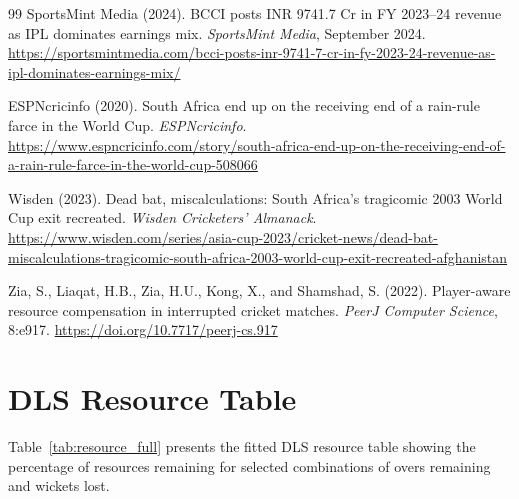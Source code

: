 \documentclass[12pt,a4paper,oneside]{report}
\begin{document}
\begin{thebibliography}{99}
SportsMint Media (2024).
\newblock BCCI posts INR 9741.7 Cr in FY 2023--24 revenue as IPL dominates earnings mix.
\newblock \emph{SportsMint Media}, September 2024.
\newblock \url{https://sportsmintmedia.com/bcci-posts-inr-9741-7-cr-in-fy-2023-24-revenue-as-ipl-dominates-earnings-mix/}

ESPNcricinfo (2020).
\newblock South Africa end up on the receiving end of a rain-rule farce in the World Cup.
\newblock \emph{ESPNcricinfo}.
\newblock \url{https://www.espncricinfo.com/story/south-africa-end-up-on-the-receiving-end-of-a-rain-rule-farce-in-the-world-cup-508066}

Wisden (2023).
\newblock Dead bat, miscalculations: South Africa's tragicomic 2003 World Cup exit recreated.
\newblock \emph{Wisden Cricketers' Almanack}.
\newblock \url{https://www.wisden.com/series/asia-cup-2023/cricket-news/dead-bat-miscalculations-tragicomic-south-africa-2003-world-cup-exit-recreated-afghanistan}

Zia, S., Liaqat, H.B., Zia, H.U., Kong, X., and Shamshad, S. (2022).
\newblock Player-aware resource compensation in interrupted cricket matches.
\newblock \emph{PeerJ Computer Science}, 8:e917.
\newblock \url{https://doi.org/10.7717/peerj-cs.917}

\end{thebibliography}


\appendix

\chapter{DLS Resource Table}
\label{app:resource_table}

Table~\ref{tab:resource_full} presents the fitted DLS resource table showing the percentage of resources remaining for selected combinations of overs remaining and wickets lost.
\end{document}

